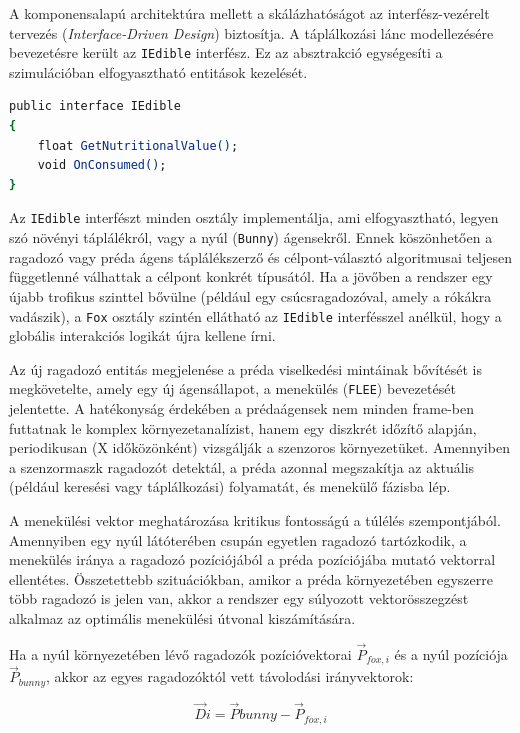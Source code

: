 A komponensalapú architektúra mellett a skálázhatóságot az interfész-vezérelt tervezés (\textit{Interface-Driven Design}) biztosítja. A táplálkozási lánc modellezésére bevezetésre került az \texttt{IEdible} interfész. Ez az absztrakció egységesíti a szimulációban elfogyasztható entitások kezelését.

\begin{lstlisting}[language=csh, caption={Az IEdible interfész vázlatos struktúrája}]
public interface IEdible
{
    float GetNutritionalValue();
    void OnConsumed();
}
\end{lstlisting}

Az \texttt{IEdible} interfészt minden osztály implementálja, ami elfogyasztható, legyen szó növényi táplálékról, vagy a nyúl (\texttt{Bunny}) ágensekről. Ennek köszönhetően a ragadozó vagy préda ágens táplálékszerző és célpont-választó algoritmusai teljesen függetlenné válhattak a célpont konkrét típusától. Ha a jövőben a rendszer egy újabb trofikus szinttel bővülne (például egy csúcsragadozóval, amely a rókákra vadászik), a \texttt{Fox} osztály szintén ellátható az \texttt{IEdible} interfésszel anélkül, hogy a globális interakciós logikát újra kellene írni.

Az új ragadozó entitás megjelenése a préda viselkedési mintáinak bővítését is megkövetelte, amely egy új ágensállapot, a menekülés (\texttt{FLEE}) bevezetését jelentette. A hatékonyság érdekében a prédaágensek nem minden frame-ben futtatnak le komplex környezetanalízist, hanem egy diszkrét időzítő alapján, periodikusan (X időközönként) vizsgálják a szenzoros környezetüket. Amennyiben a szenzormaszk ragadozót detektál, a préda azonnal megszakítja az aktuális (például keresési vagy táplálkozási) folyamatát, és menekülő fázisba lép.

A menekülési vektor meghatározása kritikus fontosságú a túlélés szempontjából. Amennyiben egy nyúl látóterében csupán egyetlen ragadozó tartózkodik, a menekülés iránya a ragadozó pozíciójából a préda pozíciójába mutató vektorral ellentétes. Összetettebb szituációkban, amikor a préda környezetében egyszerre több ragadozó is jelen van, akkor a rendszer egy súlyozott vektorösszegzést alkalmaz az optimális menekülési útvonal kiszámítására.

Ha a nyúl környezetében lévő ragadozók pozícióvektorai $\vec{P}_{fox, i}$ és a nyúl pozíciója $\vec{P}_{bunny}$, akkor az egyes ragadozóktól vett távolodási irányvektorok:

\begin{equation}
\vec{D}i = \vec{P}{bunny} - \vec{P}_{fox, i}
\end{equation}


